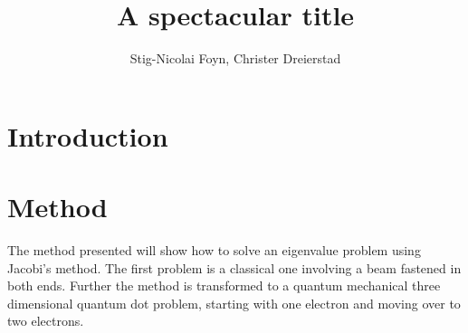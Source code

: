 \documentclass{emulateapj}
\begin{document}
\title{A spectacular title}

\author{Stig-Nicolai Foyn, Christer Dreierstad}




\begin{abstract}
\end{abstract}

\section{Introduction}
\label{sec:introduction}



\section{Method}
\label{sec:method}
The method presented will show how to solve an eigenvalue problem using Jacobi's method. The first problem is a classical one involving a beam fastened in both ends. Further the method is transformed to a quantum mechanical three dimensional quantum dot problem, starting with one electron and moving over to two electrons.
\end{document}
